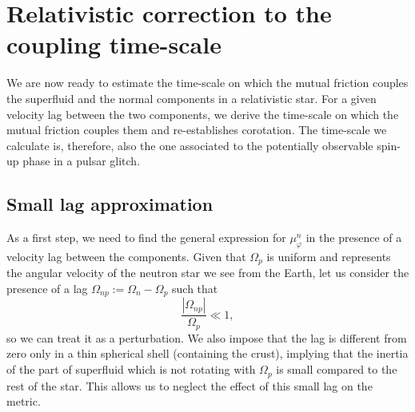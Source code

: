 \documentclass[usenatbib%
]{mnras}
\begin{document}
%
%
%
%
%
%
%


\section{Relativistic correction to the coupling time-scale}\label{the end}

We are now ready to estimate the time-scale on which the mutual friction couples the superfluid and the normal components in a relativistic star. For a given velocity lag between the two components, we derive the time-scale on which the mutual friction couples them and re-establishes corotation. The time-scale we calculate is, therefore, also the one associated to the potentially observable spin-up phase in a pulsar glitch.    


\subsection{Small lag approximation}\label{SMLapprox}

As a first step, we need to find the general expression for $\mu^n_\varphi$ in the presence of a velocity lag between the components.
Given that $\Omega_p$ is uniform and represents the angular velocity of the neutron star we see from the Earth, let us consider the presence of a lag $\Omega_{np}:=\Omega_n-\Omega_p$ such that
\begin{equation}\label{sszmall}
\dfrac{|\Omega_{np}|}{\Omega_p} \ll 1 ,
\end{equation}
so we can treat it as a perturbation. We also impose that the lag is different from zero only in a thin spherical shell (containing the crust), implying that the inertia of the part of superfluid which is not rotating with $\Omega_p$ is small compared to the rest of the star. 
This allows us to neglect the effect of this small lag on the metric.
 
\end{document}
